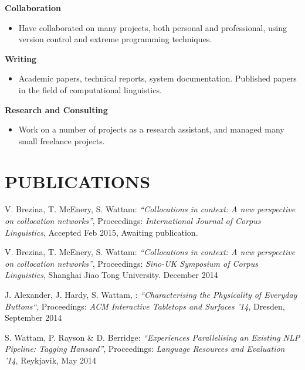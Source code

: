 \documentclass{res}
\begin{document}
\begin{resume}
  {\bf Collaboration}
    \begin{itemize}
      \item[] Have collaborated on many projects, both personal and professional, using
          version control and extreme programming techniques.
      \end{itemize}

  {\bf Writing}
    \begin{itemize} %
      \item[] Academic papers, technical reports, system documentation.
        Published papers in the field of computational linguistics.
      \end{itemize}


   {\bf  Research and Consulting} 
        \begin{itemize}
        \item[] Work on a number of projects as a research assistant, and managed many small freelance projects.
       \end{itemize} 
 


\section{PUBLICATIONS} 
\vspace{0.1in}

V. Brezina, T. McEnery, S. Wattam:
\textsl{``Collocations in context: A new perspective on collocation networks''},
Proceedings: {\it International Journal of Corpus Linguistics},
Accepted Feb 2015,
Awaiting publication.



V. Brezina, T. McEnery, S. Wattam:
\textsl{``Collocations in context: A new perspective on collocation networks''},
Proceedings: {\it Sino-UK Symposium of Corpus Linguistics},
Shanghai Jiao Tong University.
December 2014


J. Alexander, J. Hardy, S. Wattam, : 
\textsl{``Characterising the Physicality of Everyday Buttons``},
Proceedings: {\it ACM Interactive Tabletops and Surfaces '14},
Dresden,
September 2014


S. Wattam, P. Rayson \& D. Berridge: 
\textsl{``Experiences Parallelising an Existing NLP Pipeline: Tagging Hansard''},
Proceedings: {\it Language Resources and Evaluation '14},
Reykjavik,
May 2014



\end{resume}
\end{document}
